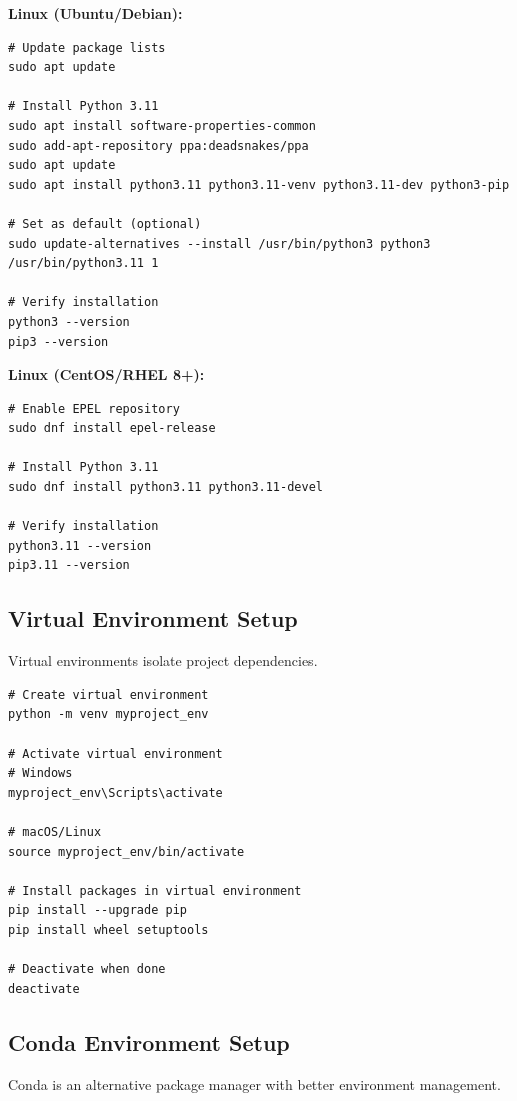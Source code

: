 \textbf{Linux (Ubuntu/Debian):}
\begin{lstlisting}[style=shell]
# Update package lists
sudo apt update

# Install Python 3.11
sudo apt install software-properties-common
sudo add-apt-repository ppa:deadsnakes/ppa
sudo apt update
sudo apt install python3.11 python3.11-venv python3.11-dev python3-pip

# Set as default (optional)
sudo update-alternatives --install /usr/bin/python3 python3 /usr/bin/python3.11 1

# Verify installation
python3 --version
pip3 --version
\end{lstlisting}

\textbf{Linux (CentOS/RHEL 8+):}
\begin{lstlisting}[style=shell]
# Enable EPEL repository
sudo dnf install epel-release

# Install Python 3.11
sudo dnf install python3.11 python3.11-devel

# Verify installation
python3.11 --version
pip3.11 --version
\end{lstlisting}

\subsection{Virtual Environment Setup}

Virtual environments isolate project dependencies.

\begin{lstlisting}[style=shell]
# Create virtual environment
python -m venv myproject_env

# Activate virtual environment
# Windows
myproject_env\Scripts\activate

# macOS/Linux
source myproject_env/bin/activate

# Install packages in virtual environment
pip install --upgrade pip
pip install wheel setuptools

# Deactivate when done
deactivate
\end{lstlisting}

\subsection{Conda Environment Setup}

Conda is an alternative package manager with better environment management.

